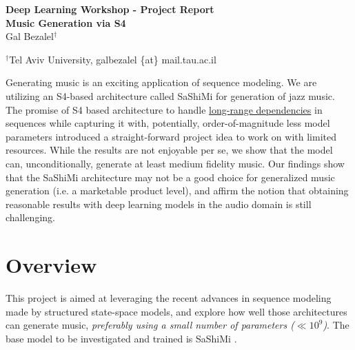 \documentclass[12pt]{article}
\begin{document}
\baselineskip 12pt

\begin{center}
\textbf{\Large Deep Learning Workshop - Project Report} \\
\textbf{\Large Music Generation via S4} \\
\vspace{1.6cc}
{ \sc Gal Bezalel$^{\dagger}$}\\

\vspace{0.3 cm}

{\small $^{\dagger}$Tel Aviv University, galbezalel \{at\} mail.tau.ac.il}
 \end{center}
\vspace{1.6cc}
\abstract
Generating music is an exciting application of sequence modeling. We are utilizing an S4-based architecture called SaShiMi \cite{goel2022itsrawaudiogeneration} for generation of jazz music. The promise of S4 based architecture to handle \href{https://srush.github.io/annotated-s4/}{long-range dependencies} in sequences while capturing it with, potentially, order-of-magnitude less model parameters introduced a straight-forward project idea to work on with limited resources. While the results are not enjoyable per se, we show that the model can, unconditionally, generate at least medium fidelity music. Our findings show that the SaShiMi architecture may not be a good choice for generalized music generation (i.e. a marketable product level), and affirm the notion that obtaining reasonable results with deep learning models in the audio domain is still challenging. 
\section{Overview} \label{form}
This project is aimed at leveraging the recent advances in sequence modeling made by structured state-space models, 
and explore how well those architectures can generate music, \textit{preferably using a small number of parameters  ($ \ll 10^{9}$)}. 
The base model to be investigated and trained is SaShiMi \cite{goel2022itsrawaudiogeneration}.
\end{document}
